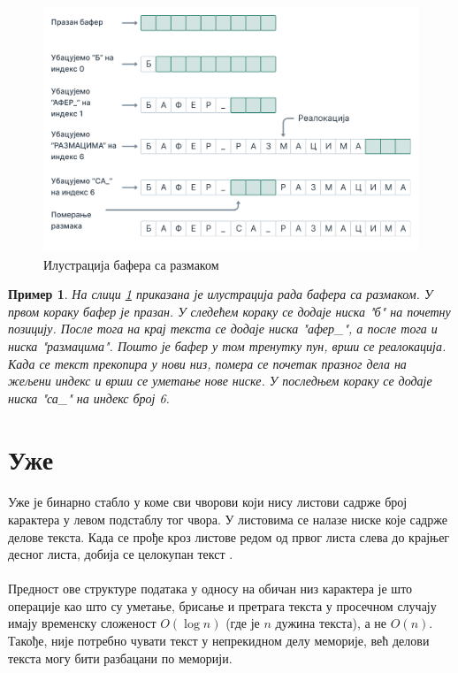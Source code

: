 \documentclass[12pt,oneside]{memoir}
\newtheorem{exmp}{Пример}
\begin{document}
\begin{figure}[!ht]
	\centering
	\includegraphics[width=1.0\textwidth]{images/Bafer_3.png}
	\caption{Илустрација бафера са размаком}
	\label{fig:gap_buffer}
\end{figure}

\begin{exmp}

На слици \ref{fig:gap_buffer} приказана је  илустрација рада бафера са размаком.
У првом кораку бафер је празан. У следећем кораку се додаје ниска \textit{"б"} на почетну позицију. После тога на крај текста се додаје ниска \textit{"афер\_"}, а после тога и ниска
\textit{"размацима"}.  Пошто је бафер у том тренутку пун, врши се реалокација. Када се текст прекопира у нови низ, помера се почетак празног дела на жељени индекс и врши се
уметање нове ниске. У последњем кораку се додаје ниска \textit{"са\_"} на индекс број 6. 

\end{exmp}


\section{Уже}
\paragraph{}
Уже је бинарно стабло у коме сви чворови који нису листови садрже број карактера у 
левом подстаблу тог чвора. У листовима се налазе ниске које садрже делове текста. 
Када се прође кроз листове редом од првог листа слева до крајњег десног листа, добија се целокупан текст \cite{Rope}.

\paragraph{}
Предност ове структуре података у односу на обичан низ карактера је што операције као што су уметање, брисање и претрага текста у просечном случају имају временску сложеност \(O(\log{}n)\) (где је \(n\) дужина текста), а не \(O(n)\). Такође, није потребно чувати
текст у непрекидном делу меморије, већ делови текста могу бити разбацани по меморији.
\end{document}
